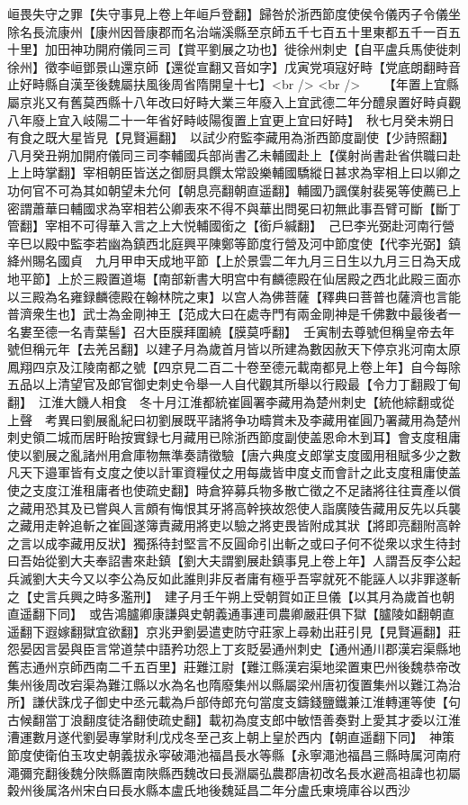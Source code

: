 峘畏失守之罪【失守事見上卷上年峘戶登翻】歸咎於浙西節度使侯令儀丙子令儀坐除名長流康州【康州因晉康郡而名治端溪縣至京師五千七百五十里東都五千一百五十里】加田神功開府儀同三司【賞平劉展之功也】徙徐州刺史【自平盧兵馬使徙刺徐州】徵李峘鄧景山還京師【還從宣翻又音如字】戊寅党項寇好畤【党底朗翻畤音止好畤縣自漢至後魏屬扶風後周省隋開皇十七】<br />
<br />
　　【年置上宜縣屬京兆又有舊莫西縣十八年改曰好畤大業三年廢入上宜武德二年分醴泉置好畤貞觀八年廢上宜入岐陽二十一年省好畤岐陽復置上宜更上宜曰好畤】　秋七月癸未朔日有食之既大星皆見【見賢遍翻】　以試少府監李藏用為浙西節度副使【少詩照翻】　八月癸丑朔加開府儀同三司李輔國兵部尚書乙未輔國赴上【僕射尚書赴省供職曰赴上上時掌翻】宰相朝臣皆送之御厨具饌太常設樂輔國驕縱日甚求為宰相上曰以卿之功何官不可為其如朝望未允何【朝息亮翻朝直遥翻】輔國乃諷僕射裴冕等使薦已上密謂蕭華曰輔國求為宰相若公卿表來不得不與華出問冕曰初無此事吾臂可斷【斷丁管翻】宰相不可得華入言之上大悦輔國銜之【銜戶緘翻】　己巳李光弼赴河南行營　辛巳以殿中監李若幽為鎮西北庭興平陳鄭等節度行營及河中節度使【代李光弼】鎮絳州賜名國貞　九月甲申天成地平節【上於景雲二年九月三日生以九月三日為天成地平節】上於三殿置道塲【南部新書大明宫中有麟德殿在仙居殿之西北此殿三面亦以三殿為名雍録麟德殿在翰林院之東】以宫人為佛菩薩【釋典曰菩普也薩濟也言能普濟衆生也】武士為金剛神王【范成大曰在處寺門有兩金剛神是千佛數中最後者一名婁至德一名青葉髻】召大臣膜拜圍繞【膜莫呼翻】　壬寅制去尊號但稱皇帝去年號但稱元年【去羌呂翻】以建子月為歲首月皆以所建為數因赦天下停京兆河南太原鳳翔四京及江陵南都之號【四京見二百二十卷至德元載南都見上卷上年】自今每除五品以上清望官及郎官御史刺史令舉一人自代觀其所舉以行殿最【令力丁翻殿丁甸翻】　江淮大饑人相食　冬十月江淮都統崔圓署李藏用為楚州刺史【統他綜翻或從上聲　考異曰劉展亂紀曰初劉展既平諸將争功疇賞未及李藏用崔圓乃署藏用為楚州刺史領二城而居盱眙按實録七月藏用已除浙西節度副使盖恩命木到耳】會支度租庸使以劉展之亂諸州用倉庫物無準奏請徵驗【唐六典度攴郎掌支度國用租賦多少之數凡天下邉軍皆有攴度之使以計軍資糧仗之用每歲皆申度攴而會計之此支度租庸使盖使之支度江淮租庸者也使疏史翻】時倉猝募兵物多散亡徵之不足諸將往往賣產以償之藏用恐其及已嘗與人言頗有悔恨其牙將高幹挾故怨使人詣廣陵告藏用反先以兵襲之藏用走幹追斬之崔圓遂簿責藏用將吏以驗之將吏畏皆附成其狀【將即亮翻附高幹之言以成李藏用反狀】獨孫待封堅言不反圓命引出斬之或曰子何不從衆以求生待封曰吾始從劉大夫奉詔書來赴鎮【劉大夫謂劉展赴鎮事見上卷上年】人謂吾反李公起兵滅劉大夫今又以李公為反如此誰則非反者庸有極乎吾寜就死不能誣人以非罪遂斬之【史言兵興之時多濫刑】　建子月壬午朔上受朝賀如正旦儀【以其月為歲首也朝直遥翻下同】　或告鴻臚卿康謙與史朝義通事連司農卿嚴莊俱下獄【臚陵如翻朝直遥翻下遐嫁翻獄宜欲翻】京兆尹劉晏遣吏防守莊家上尋勑出莊引見【見賢遍翻】莊怨晏因言晏與臣言常道禁中語矜功怨上丁亥貶晏通州刺史【通州通川郡漢宕渠縣地舊志通州京師西南二千五百里】莊難江尉【難江縣漢宕渠地梁置東巴州後魏恭帝改集州後周改宕渠為難江縣以水為名也隋廢集州以縣屬梁州唐初復置集州以難江為治所】謙伏誅戊子御史中丞元載為戶部侍郎充句當度支鑄錢鹽鐵兼江淮轉運等使【句古候翻當丁浪翻度徒洛翻使疏史翻】載初為度支郎中敏悟善奏對上愛其才委以江淮漕運數月遂代劉晏專掌財利戊戍冬至己亥上朝上皇於西内【朝直遥翻下同】　神策節度使衛伯玉攻史朝義拔永寜破澠池福昌長水等縣【永寧澠池福昌三縣時属河南府澠彌兖翻後魏分陜縣置南陜縣西魏改曰長淵屬弘農郡唐初改名長水避高祖諱也初屬糓州後属洛州宋白曰長水縣本盧氏地後魏延昌二年分盧氏東境庫谷以西沙